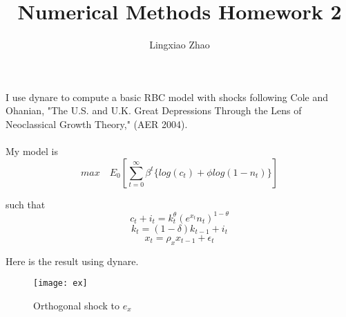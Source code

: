 \documentclass{article}
\author{Lingxiao Zhao}
\title{Numerical Methods Homework 2}
\begin{document}
\maketitle
I use dynare to compute a basic RBC model with shocks following Cole and Ohanian, "The U.S. and U.K. Great Depressions Through the Lens of Neoclassical Growth Theory," (AER 2004).\\~\\

My model is
$$ max \quad E_0[\sum_{t=0}^{\infty}\beta^t\{log(c_t)+\phi log(1-n_t)\}]$$

such that
$$c_t+i_t=k_t^{\theta}(e^{x_t}n_t)^{1-\theta}$$
$$k_t=(1-\delta)k_{t-1}+i_t$$
$$x_t=\rho_xx_{t-1}+\epsilon_t$$

Here is the result using dynare.

\begin{figure}[H]
	\centering		
\end{figure}

\begin{figure}[H]
\texttt{[image: ex]}
\caption{Orthogonal shock to $e_x$}
\end{figure}
\end{document}
